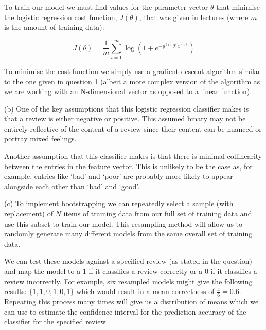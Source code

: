 \documentclass[12pt]{article}
\begin{document}
\indent To train our model we must find values for the parameter vector $\theta$ that minimise the logistic regression cost function, $J(\theta)$, that was given in lectures (where $m$ is the amount of training data):

$$J(\theta) = \frac{1}{m} \sum_{i = 1}^m \log(1 + e^{-y^{(i)} \theta^T x^{(i)}})$$

\indent To minimise the cost function we simply use a gradient descent algorithm similar to the one given in question 1 (albeit a more complex version of the algorithm as we are working with an N-dimensional vector as opposed to a linear function).

\noindent (b) One of the key assumptions that this logistic regression classifier makes is that a review is either negative or positive. This assumed binary may not be entirely reflective of the content of a review since their content can be nuanced or portray mixed feelings.

\indent Another assumption that this classifier makes is that there is minimal collinearity between the entries in the feature vector. This is unlikely to be the case as, for example, entries like `bad' and `poor' are probably more likely to appear alongside each other than `bad' and `good'.

\noindent (c) To implement bootstrapping we can repeatedly select a sample (with replacement) of $N$ items of training data from our full set of training data and use this subset to train our model. This resampling method will allow us to randomly generate many different models from the same overall set of training data.

\indent We can test these models against a specified review (as stated in the question) and map the model to a $1$ if it classifies a review correctly or a $0$ if it classifies a review incorrectly. For example, six resampled models might give the following results: $\{ 1, 1, 0, 1, 0, 1 \}$ which would result in a mean correctness of $\frac{4}{6} = 0.\overline{6}$. Repeating this process many times will give us a distribution of means which we can use to estimate the confidence interval for the prediction accuracy of the classifier for the specified review.
\end{document}
